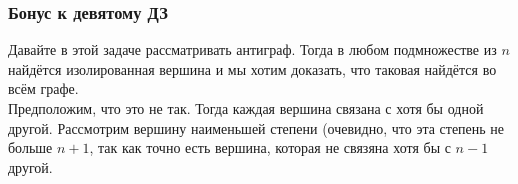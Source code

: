 \subsubsection{Бонус к девятому ДЗ}


Давайте в этой задаче рассматривать антиграф. Тогда в любом подмножестве из $n$ найдётся изолированная вершина и мы хотим доказать, что таковая найдётся во всём графе.\\
Предположим, что это не так. Тогда каждая вершина связана с хотя бы одной другой. Рассмотрим вершину наименьшей степени (очевидно, что эта степень не больше $n+1$, так как точно есть вершина, которая не связяна хотя бы с $n-1$ другой.